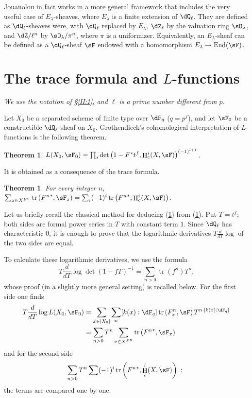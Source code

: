 \documentclass[12pt,oneside,english]{smfbook}
\DeclareMathOperator{\h}{H}
\DeclareMathOperator{\tr}{tr}
\newcounter{char}
\newtheorem{theorem_}[subsection]{Theorem}
\begin{document}
Jouanolou in fact works in a more general framework that includes the very useful case of $E_\lambda$-sheaves, where $E_\lambda$ is a finite extension of $\dQ_\ell$. They are defined as $\dQ_\ell$-sheaves were, with $\dQ_\ell$ replaced by $E_\lambda$, $\dZ_\ell$ by the valuation ring $\sO_\lambda$, and $\dZ/\ell^n$ by $\sO_\lambda/\pi^n$, where $\pi$ is a uniformizer. Equivalently, an $E_\lambda$-sheaf can be defined as a $\dQ_\ell$-sheaf $\sF$ endowed with a homomorphism $E_\lambda\to\operatorname{End}(\sF)$.

\section{The trace formula and \texorpdfstring{$L$}{L}-functions}\label{II:3}

\emph{We use the notation of \S\ref{II:1}, and $\ell$ is a prime number different from $p$.}

Let $X_0$ be a separated scheme of finite type over $\dF_q$ ($q=p^f$), and let $\sF_0$ be a constructible $\dQ_\ell$-sheaf on $X_0$. Grothendieck's cohomological interpretation of $L$-functions is the following theorem.

\begin{theorem_}\label{II:3-1}
$L(X_0,\sF_0) = \prod_i \det\left(1-F^* t^f, \h_c^i(X,\sF)\right)^{(-1)^{i+1}}$.
\end{theorem_}

It is obtained as a consequence of the trace formula.

\begin{theorem_}\label{II:3-2}
For every integer $n$, $\sum_{x\in X^{F^n}} \tr\left({F^n}^*,\sF_x\right) = \sum_i (-1)^i \tr\left({F^n}^*,\h_c^i(X,\sF)\right)$.
\end{theorem_}

Let us briefly recall the classical method for deducing (\ref{II:3-1}) from (\ref{II:3-2}). Put $T=t^f$; both sides are formal power series in $T$ with constant term $1$. Since $\dQ_\ell$ has characteristic $0$, it is enough to prove that the logarithmic derivatives $T\frac{d}{dT}\log$ of the two sides are equal.

To calculate these logarithmic derivatives, we use the formula
\[
  T \frac{d}{dT}\log\det(1-f T)^{-1} = \sum_{n>0} \tr(f^n) T^n \text{,}
\]
whose proof (in a slightly more general setting) is recalled below. For the first side one finds
\begin{align*}
  T\frac{d}{dT}\log L(X_0,\sF_0)
    &= \sum_{x\in |X_0|} \sum_n [k(x):\dF_q] \tr\left(F_x^n,\sF\right) T^{n\cdot[k(x):\dF_q]} \\
    &= \sum_{n>0} T^n \sum_{x\in X^{F^n}} \tr\left({F^n}^*,\sF_x\right)
\end{align*}
and for the second side
\[
  \sum_{n>0} T^n \sum (-1)^i \tr\left({F^n}^*,\h_c^i(X,\sF)\right) \text{ ; }
\]
the terms are compared one by one.
\end{document}
